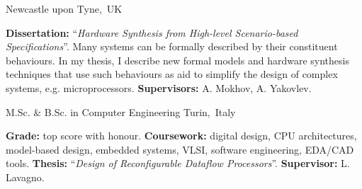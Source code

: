 
\begin{cventries}
\vspace{-4mm}

\cventry
{} %
{} %
{\vspace{-8mm}Newcastle upon Tyne,~UK} %
{} %
{ %
\begin{cvitems}
\textbf{Dissertation:} ``\textit{Hardware Synthesis from High-level 
Scenario-based Specifications}''. Many systems can be formally described 
by their constituent behaviours. In my thesis, I describe new formal models and 
hardware synthesis techniques that use such behaviours as aid to 
simplify the design of complex systems, e.g. microprocessors.
\textbf{Supervisors:} A. Mokhov, A. Yakovlev.
\end{cvitems}
}
\vspace{-4mm}

\cventry
{}
{\vspace{-8mm}M.Sc. \& B.Sc. in Computer Engineering }
{\vspace{-8mm}Turin,~Italy}
{}
{
\begin{cvitems}
\textbf{Grade:} top score with honour. \textbf{Coursework:} 
digital design, CPU architectures, model-based design, embedded systems, VLSI,
software engineering, EDA/CAD tools. \textbf{Thesis:} 
``\emph{Design 
of Reconfigurable Dataflow Processors}''. \textbf{Supervisor:} L. Lavagno.
\end{cvitems}
}


\end{cventries}
\vspace{-2mm}